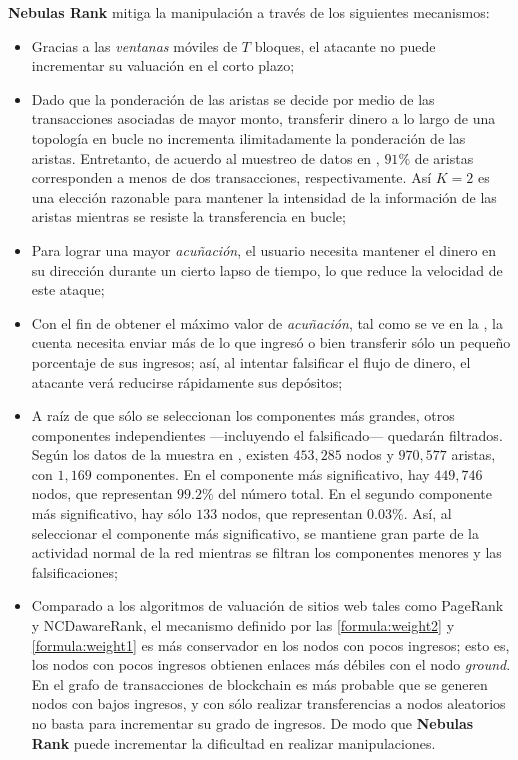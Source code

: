 \textbf{Nebulas Rank} mitiga la manipulación a través de los siguientes mecanismos:
\begin{itemize}
	\item Gracias a las \textit{ventanas} móviles de $T$ bloques, el atacante no puede incrementar su valuación en el corto plazo;
	\item Dado que la ponderación de las aristas se decide por medio de las transacciones asociadas de mayor monto, transferir dinero a lo largo de una topología en bucle no incrementa ilimitadamente la ponderación de las aristas. Entretanto, de acuerdo al muestreo de datos en , $91\%$ de aristas corresponden a menos de dos transacciones, respectivamente. Así $K=2$ es una elección razonable para mantener la intensidad de la información de las aristas mientras se resiste la transferencia en bucle;
	\item Para lograr una mayor \textit{acuñación}, el usuario necesita mantener el dinero en su dirección durante un cierto lapso de tiempo, lo que reduce la velocidad de este ataque;
	\item Con el fin de obtener el máximo valor de \textit{acuñación}, tal como se ve en la , la cuenta necesita enviar más de lo que ingresó o bien transferir sólo un pequeño porcentaje de sus ingresos; así, al intentar falsificar el flujo de dinero, el atacante verá reducirse rápidamente sus depósitos;
	\item A raíz de que sólo se seleccionan los componentes más grandes, otros componentes independientes —incluyendo el falsificado— quedarán filtrados. Según los datos de la muestra en , existen $453,285$ nodos y $970,577$ aristas, con $1,169$ componentes. En el componente más significativo, hay $449,746$ nodos, que representan $99.2\%$ del número total. En el segundo componente más significativo, hay sólo $133$ nodos, que representan $0.03\%$. Así, al seleccionar el componente más significativo, se mantiene gran parte de la actividad normal de la red mientras se filtran los componentes menores y las falsificaciones;
	\item Comparado a los algoritmos de valuación de sitios web tales como PageRank y NCDawareRank\cite{Nikolakopoulos2013}, el mecanismo definido por las \ref{formula:weight2} y \ref{formula:weight1} es más conservador en los nodos con pocos ingresos; esto es, los nodos con pocos ingresos obtienen enlaces más débiles con el nodo \textit{ground}. En el grafo de transacciones de blockchain es más probable que se generen nodos con bajos ingresos, y con sólo realizar transferencias a nodos aleatorios no basta para incrementar su grado de ingresos. De modo que \textbf{Nebulas Rank} puede incrementar la dificultad en realizar manipulaciones.
\end{itemize}

